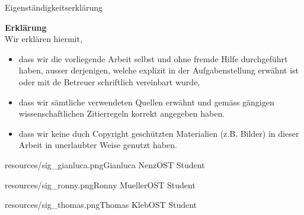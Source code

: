 Eigenständigkeitserklärung

\vspace{2 cm}

\noindent \textbf{Erklärung} \\
Wir erklären hiermit, \\

\begin{itemize}
    \item dass wir die vorliegende Arbeit selbst und ohne fremde Hilfe durchgeführt haben, ausser derjenigen, welche explizit in der Aufgabenstellung erwähnt ist oder mit de Betreuer schriftlich vereinbart wurde,
    \item dass wir sämtliche verwendeten Quellen erwähnt und gemäss gängigen wissen\-schaftlichen Zitierregeln korrekt angegeben haben.
    \item dass wir keine duch Copyright geschützten Materialien (z.B. Bilder) in dieser Arbeit in unerlaubter Weise genutzt haben.
\end{itemize}

\signature{0.6}{resources/sig_gianluca.png}{Gianluca Nenz}{OST Student}\hfill\signature{2}{resources/sig_ronny.png}{Ronny Mueller}{OST Student}

\signature{0.2}{resources/sig_thomas.png}{Thomas Kleb}{OST Student}

